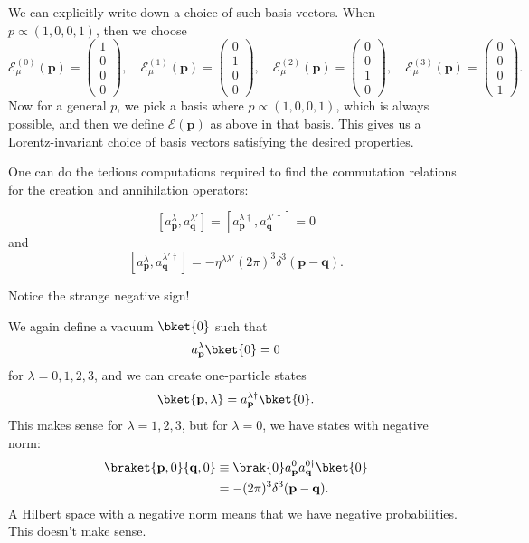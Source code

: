 \documentclass[a4paper]{article}
\begin{document}
We can explicitly write down a choice of such basis vectors. When $p \propto (1, 0, 0, 1)$, then we choose
\[
  \mathcal{E}^{(0)}_\mu(\mathbf{p}) =
  \begin{pmatrix}
    1\\0\\0\\0
  \end{pmatrix},\quad
  \mathcal{E}^{(1)}_\mu(\mathbf{p}) =
  \begin{pmatrix}
    0\\1\\0\\0
  \end{pmatrix},\quad
  \mathcal{E}^{(2)}_\mu(\mathbf{p}) =
  \begin{pmatrix}
    0\\0\\1\\0
  \end{pmatrix},\quad
  \mathcal{E}^{(3)}_\mu(\mathbf{p}) =
  \begin{pmatrix}
    0\\0\\0\\1
  \end{pmatrix}.
\]
Now for a general $p$, we pick a basis where $p \propto (1, 0, 0, 1)$, which is always possible, and then we define $\mathcal{E}(\mathbf{p})$ as above in that basis. This gives us a Lorentz-invariant choice of basis vectors satisfying the desired properties.

One can do the tedious computations required to find the commutation relations for the creation and annihilation operators:
\begin{thm}
  \[
    [a_\mathbf{p}^\lambda, a_\mathbf{q}^{\lambda'}] = [a_\mathbf{p}^{\lambda\dagger}, a_\mathbf{q}^{\lambda'\dagger}] = 0
  \]
  and
  \[
    [a_\mathbf{p}^\lambda, a_\mathbf{q}^{\lambda' \dagger}] = -\eta^{\lambda\lambda'} (2\pi)^3 \delta^3(\mathbf{p} - \mathbf{q}).
  \]
\end{thm}
Notice the strange negative sign!

We again define a vacuum $\bket{0}$ such that
\[
  a_\mathbf{p}^\lambda \bket{0} = 0
\]
for $\lambda = 0, 1, 2, 3$, and we can create one-particle states
\[
  \bket{\mathbf{p}, \lambda} = a_\mathbf{p}^{\lambda\dagger} \bket{0}.
\]
This makes sense for $\lambda = 1, 2, 3$, but for $\lambda = 0$, we have states with negative norm:
\begin{align*}
  \braket{\mathbf{p}, 0}{\mathbf{q}, 0} &\equiv \brak{0} a_\mathbf{p}^0 a_\mathbf{q}^{0\dagger}\bket{0}\\
  &= -(2\pi)^3 \delta^3(\mathbf{p} - \mathbf{q}).
\end{align*}
A Hilbert space with a negative norm means that we have negative probabilities. This doesn't make sense.
\end{document}
